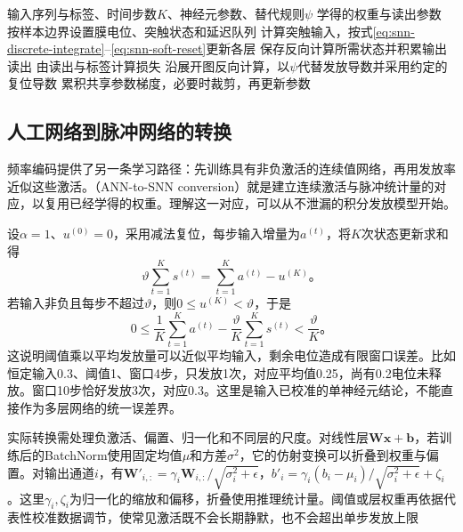 \begin{algorithm}[脉冲网络的监督训练]
  \label{alg:snn-supervised}
  \begin{algorithmic}[1]
    \Require 输入序列与标签、时间步数$K$、神经元参数、替代规则$\psi$
    \Ensure 学得的权重与读出参数
      \State 按样本边界设置膜电位、突触状态和延迟队列
        \State 计算突触输入，按式\eqref{eq:snn-discrete-integrate}--\eqref{eq:snn-soft-reset}更新各层
        \State 保存反向计算所需状态并积累输出读出
      \EndFor
      \State 由读出与标签计算损失
      \State 沿展开图反向计算，以$\psi$代替发放导数并采用约定的复位导数
      \State 累积共享参数梯度，必要时裁剪，再更新参数
    \EndFor
  \end{algorithmic}
\end{algorithm}

\subsection{人工网络到脉冲网络的转换}
\label{sec:snn-conversion}

频率编码提供了另一条学习路径：先训练具有非负激活的连续值网络，再用发放率近似这些激活。（ANN-to-SNN conversion）就是建立连续激活与脉冲统计量的对应，以复用已经学得的权重。理解这一对应，可以从不泄漏的积分发放模型开始。

设$\alpha=1$、$u^{(0)}=0$，采用减法复位，每步输入增量为$a^{(t)}$，将$K$次状态更新求和得
\begin{equation}
  \vartheta\sum_{t=1}^{K}s^{(t)}
  =\sum_{t=1}^{K}a^{(t)}-u^{(K)}\text{。}
  \label{eq:snn-conversion-balance}
\end{equation}
若输入非负且每步不超过$\vartheta$，则$0\leq u^{(K)}<\vartheta$，于是
\begin{equation}
  0\leq\frac1K\sum_{t=1}^{K}a^{(t)}
       -\frac{\vartheta}{K}\sum_{t=1}^{K}s^{(t)}
  <\frac{\vartheta}{K}\text{。}
  \label{eq:snn-conversion-error}
\end{equation}
这说明阈值乘以平均发放量可以近似平均输入，剩余电位造成有限窗口误差。比如恒定输入0.3、阈值1、窗口4步，只发放1次，对应平均值0.25，尚有0.2电位未释放。窗口10步恰好发放3次，对应0.3。这里是输入已校准的单神经元结论，不能直接作为多层网络的统一误差界。

实际转换需处理负激活、偏置、归一化和不同层的尺度。对线性层$\bm W\bm x+\bm b$，若训练后的BatchNorm使用固定均值$\mu$和方差$\sigma^2$，它的仿射变换可以折叠到权重与偏置。对输出通道$i$，有$\bm W'_{i,:}=\gamma_i\bm W_{i,:}/\sqrt{\sigma_i^2+\epsilon}$，$b'_i=\gamma_i(b_i-\mu_i)/\sqrt{\sigma_i^2+\epsilon}+\zeta_i$。这里$\gamma_i,\zeta_i$为归一化的缩放和偏移，折叠使用推理统计量。阈值或层权重再依据代表性校准数据调节，使常见激活既不会长期静默，也不会超出单步发放上限

